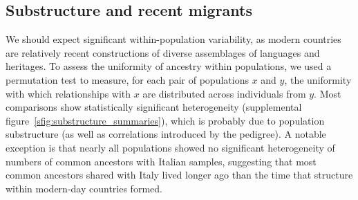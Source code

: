 \documentclass{article}
\begin{document}
\subsection{Substructure and recent migrants}

We should expect significant within-population variability, 
as modern countries are relatively recent constructions of diverse assemblages of languages and heritages. 
To assess the uniformity of ancestry within populations,
we used a permutation test to measure, for each pair of populations $x$ and $y$,
the uniformity with which relationships with $x$ are distributed across individuals from $y$. 
Most comparisons show statistically significant heterogeneity (supplemental figure~\ref{sfig:substructure_summaries}),
which is probably due to population substructure (as well as correlations introduced by the pedigree). 
A notable exception is that nearly all populations showed no
significant heterogeneity of numbers of common ancestors with Italian samples,
suggesting that most common ancestors shared with Italy lived longer ago than the time that structure within modern-day countries formed.
\end{document}
